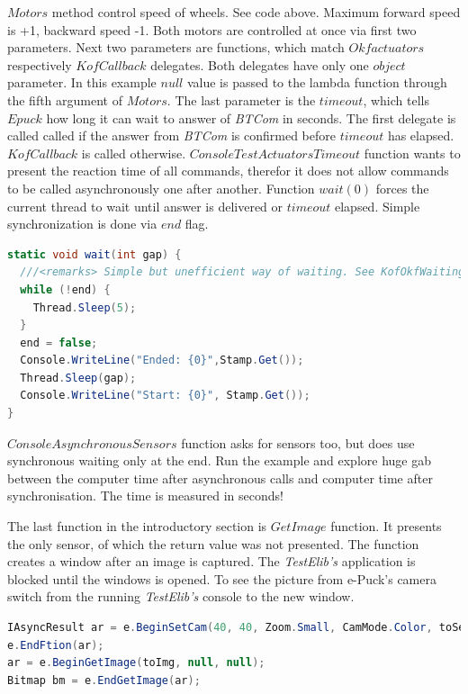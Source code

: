   $Motors$ method control speed of wheels. See code above. Maximum forward speed is +1, backward speed -1. 
  Both motors are controlled at once via first two parameters.
  Next two parameters are functions, which match $Okfactuators$ respectively $KofCallback$ delegates. 
  Both delegates have only one $object$ parameter. In this example $null$ value is passed
  to the lambda function through the fifth argument of $Motors$. The last parameter is the $timeout$, 
  which tells $Epuck$ how long it can wait to answer of {\it BTCom} in seconds.
  The first delegate is called called if the answer from {\it BTCom} is confirmed before $timeout$ has elapsed. 
  $KofCallback$ is called otherwise.
  $ConsoleTestActuatorsTimeout$ function wants to present the reaction time of all commands, 
  therefor it does not allow commands to be called asynchronously one after another.
  Function $wait(0)$ forces the current thread to wait until answer is delivered
  or $timeout$ elapsed. Simple synchronization is done via $end$ flag.
\begin{lstlisting}[language=cs]
static void wait(int gap) {
  ///<remarks> Simple but unefficient way of waiting. See KofOkfWaiting(..) in Behaviour for usage of EventWaitHandle.</remarks>
  while (!end) { 
    Thread.Sleep(5); 
  } 
  end = false; 
  Console.WriteLine("Ended: {0}",Stamp.Get());
  Thread.Sleep(gap);
  Console.WriteLine("Start: {0}", Stamp.Get());
}
\end{lstlisting}

  $ConsoleAsynchronousSensors$ function asks for sensors too, but does use synchronous waiting only at the end. Run the example and explore huge gab
  between the computer time after asynchronous calls and computer time after synchronisation. 
  The time is measured in seconds!
  
  The last function in the introductory section is $GetImage$ function. 
  It presents the only sensor, of which the return value was not presented.
  The function creates a window after an image is captured. 
  The {\it TestElib's} application is blocked until the windows is opened. To see the picture from
  e-Puck's camera switch from the running {\it TestElib's} console to the new window.


\begin{lstlisting}[language=cs]
IAsyncResult ar = e.BeginSetCam(40, 40, Zoom.Small, CamMode.Color, toSetCam, null, null);
e.EndFtion(ar);
ar = e.BeginGetImage(toImg, null, null);
Bitmap bm = e.EndGetImage(ar);	
\end{lstlisting}


